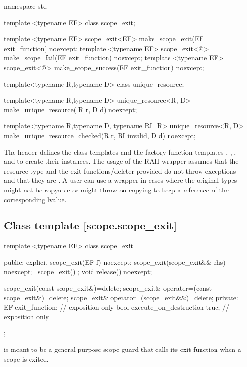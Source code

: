 \documentclass[ebook,11pt,article]{memoir}
\begin{document}
\begin{codeblock}
namespace std {
template <typename EF>
class scope_exit;

template <typename EF>
scope_exit<EF> make_scope_exit(EF exit_function) noexcept;
template <typename EF>
scope_exit<@\seebelow@> make_scope_fail(EF exit_function) noexcept;
template <typename EF>
scope_exit<@\seebelow@> make_scope_success(EF exit_function) noexcept;

template<typename R,typename D>
class unique_resource;

template<typename R,typename D>
unique_resource<R, D>
make_unique_resource( R  r, D d) noexcept;

template<typename R,typename D, typename RI=R>
unique_resource<R, D>
make_unique_resource_checked(R r, RI invalid, D d) noexcept;

}
\end{codeblock}

\pnum
The header   defines the class templates   
and the factory function templates , ,
,
 and   to create their instances. The usage of the RAII wrapper assumes that the resource type and the exit functions/deleter provided do not throw exceptions and that they are .
\enternote
A user can use a  wrapper in cases where the original types might not be copyable or might throw on copying to keep a reference of the corresponding lvalue.
\exitnote 

\subsection {Class template  [scope.scope_exit]}

\begin{codeblock}
template <typename EF>
class scope_exit {
public:
  explicit
  scope_exit(EF f) noexcept;
  scope_exit(scope_exit&& rhs) noexcept;
  ~scope_exit() ;
  void release() noexcept;

  scope_exit(const scope_exit&)=delete;
  scope_exit& operator=(const scope_exit&)=delete;
  scope_exit& operator=(scope_exit&&)=delete;
private:
  EF exit_function;    // exposition only
  bool execute_on_destruction {true}; // exposition only
};
\end{codeblock}
\pnum
\enternote
{} is meant to be a general-purpose scope guard that calls its exit function when a scope is exited.
\exitnote
\end{document}
